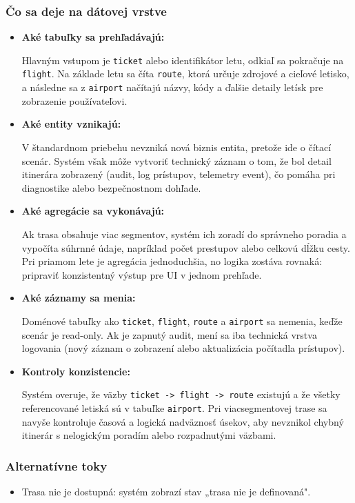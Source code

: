 \documentclass[11pt, a4paper]{article}
\begin{document}
\subsubsection*{Čo sa deje na dátovej vrstve}
\begin{itemize}
    \item \textbf{Aké tabuľky sa prehľadávajú:} 
    
    Hlavným vstupom je \texttt{ticket} alebo identifikátor letu, odkiaľ sa pokračuje na \texttt{flight}. Na základe letu sa číta \texttt{route}, ktorá určuje zdrojové a cieľové letisko, a následne sa z \texttt{airport} načítajú názvy, kódy a ďalšie detaily letísk pre zobrazenie používateľovi.
    
    \item \textbf{Aké entity vznikajú:} 
    
    V štandardnom priebehu nevzniká nová biznis entita, pretože ide o čítací scenár. Systém však môže vytvoriť technický záznam o tom, že bol detail itinerára zobrazený (audit, log prístupov, telemetry event), čo pomáha pri diagnostike alebo bezpečnostnom dohľade.
    
    \item \textbf{Aké agregácie sa vykonávajú:} 
    
    Ak trasa obsahuje viac segmentov, systém ich zoradí do správneho poradia a vypočíta súhrnné údaje, napríklad počet prestupov alebo celkovú dĺžku cesty. Pri priamom lete je agregácia jednoduchšia, no logika zostáva rovnaká: pripraviť konzistentný výstup pre UI v jednom prehľade.
    
    \item \textbf{Aké záznamy sa menia:} 
    
    Doménové tabuľky ako \texttt{ticket}, \texttt{flight}, \texttt{route} a \texttt{airport} sa nemenia, keďže scenár je read-only. Ak je zapnutý audit, mení sa iba technická vrstva logovania (nový záznam o zobrazení alebo aktualizácia počítadla prístupov).
    
    \item \textbf{Kontroly konzistencie:} 
    
    Systém overuje, že väzby \texttt{ticket -> flight -> route} existujú a že všetky referencované letiská sú v tabuľke \texttt{airport}. Pri viacsegmentovej trase sa navyše kontroluje časová a logická nadväznosť úsekov, aby nevznikol chybný itinerár s nelogickým poradím alebo rozpadnutými väzbami.
\end{itemize}

\subsubsection*{Alternatívne toky}
\begin{itemize}
    \item Trasa nie je dostupná: systém zobrazí stav „trasa nie je definovaná".
\end{itemize}
\end{document}
